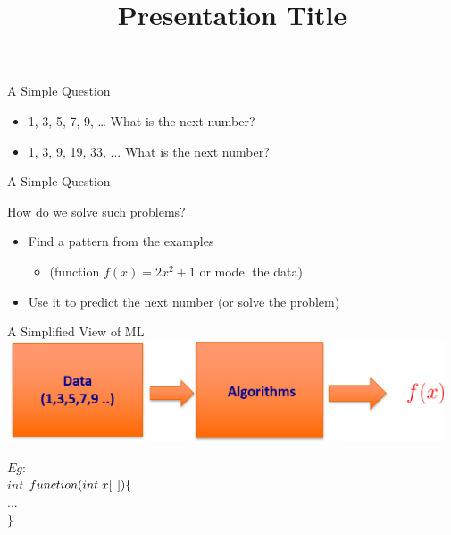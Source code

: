 \documentclass[aspectratio=169,14pt]{beamer}
\title[Regression Models]{Presentation Title}
\begin{document}
{\1
\begin{frame}
\end{frame}
}

\begin{frame}{A Simple Question}
\begin{overprint}
  \begin{itemize}
  \item<2->\alert{1, 3, 5, 7, 9, …	What is the next number?} \\
 

\vspace{3ex}
\item<5-> \alert{1, 3, 9, 19, 33, ... What is the next number?} \\
   
  \end{itemize}
\end{overprint}
\end{frame}

\begin{frame}{A Simple Question}

\begin{block}{How do we solve such problems?}
\begin{itemize}
\item<2-> Find a pattern from the examples
\begin{itemize}
\item<2->(function \alert{$f(x)=2{x^2}+1$} or model the data)
\end{itemize}
\item<3-> Use it to predict the next number (or solve the  problem)
\end{itemize}
\end{block}
\end{frame}

\begin{frame}{A Simplified View of ML}
\includegraphics[width=13cm,height=3cm]{Images/Lin_reg_pic1.png}

\vfill
\hspace{8.8cm}
 $Eg:$ \\
\hfill
$int$  $function(int\;x[\hspace{1ex}])\{$ \\
\hspace{8.8cm}
$...$ \\
\hspace{8.8cm}
$\}$

\end{frame}
\end{document}
